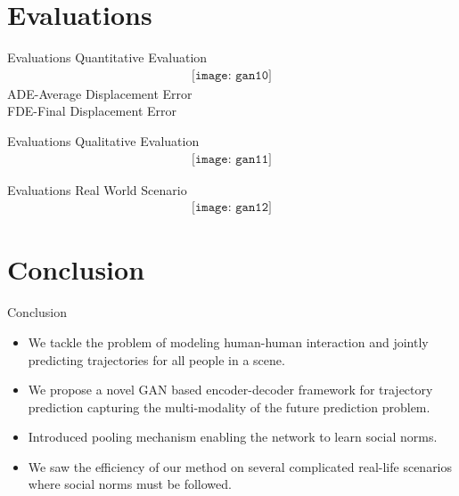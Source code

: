 \documentclass{beamer}
\begin{document}
\section{Evaluations}
\begin{frame}{Evaluations} 
\huge Quantitative Evaluation
 \begin{align*}
    \texttt{[image: gan10]}  
\end{align*}
\small ADE-Average Displacement Error\\
\small FDE-Final Displacement Error
\end{frame}

\begin{frame}{Evaluations} 
\huge Qualitative Evaluation
 \begin{align*}
    \texttt{[image: gan11]}  
\end{align*}

\end{frame}
\begin{frame}{Evaluations} 
\huge Real World Scenario
 \begin{align*}
    \texttt{[image: gan12]}  
\end{align*}
\end{frame}
\section{Conclusion}
\begin{frame}{Conclusion}
    \begin{itemize}
        \item We tackle the problem of modeling human-human
interaction and jointly predicting trajectories for all
people in a scene.
        \item We propose a novel GAN based encoder-decoder
framework for trajectory prediction capturing the
multi-modality of the future prediction problem.
        \item Introduced pooling mechanism enabling the network to learn social norms.
       \item We saw the efficiency of
our method on several complicated real-life scenarios where
social norms must be followed.


    \end{itemize}
\end{frame}
\end{document}
